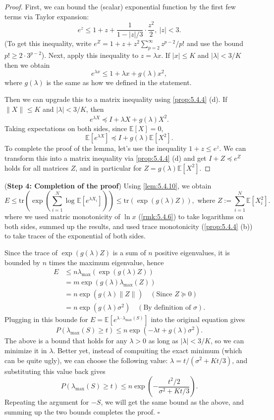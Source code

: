 \begin{proof}
First, we can bound the (scalar) exponential function by the first few terms via Taylor expansion:
\[ e^z \leq 1 + z + \frac{1}{1 - |z| / 3} \cdot \frac{z^2}{2}, \ |z| < 3. \]
(To get this inequality, write $e^Z = 1 + z + z^2 \sum_{p = 2}^{\infty} z^{p - 2} / p!$ and use the bound 
$p! \geq 2 \cdot 3^{p - 2}$). Next, apply this inequality to $z = \lambda x$. If $|x| \leq K$ and 
$|\lambda| < 3/K$ then we obtain 
\[ e^{\lambda x} \leq 1 + \lambda x + g(\lambda)x^2, \]
where $g(\lambda)$ is the same as how we defined in the statement.

Then we can upgrade this to a matrix inequality using \cref{prop:5.4.4} (d). If $\lVert X \rVert_{} \leq K$ and 
$|\lambda| < 3 / K$, then 
\[ e^{\lambda X} \preceq I + \lambda X + g(\lambda) X^2. \]
Taking expectations on both sides, since $\mathbb{E}[X] = 0$, 
\[ \mathbb{E}[e^{\lambda X}] \preceq I + g(\lambda) \mathbb{E}[X^2]. \]
To complete the proof of the lemma, let's use the inequality $1 + z \leq e^z$. We can transform this into a 
matrix inequality via \cref{prop:5.4.4} (d) and get $I + Z \preceq e^Z$ holds for all matrices $Z$, and in 
particular for $Z = g(\lambda)\mathbb{E}[X^2]$.
\end{proof}

(\textbf{Step 4: Completion of the proof}) Using \cref{lem:5.4.10}, we obtain 
\[ E \leq \mathrm{tr}\left( \exp{\left( \sum_{i = 1}^{N} \log_{}{\mathbb{E}[e^{\lambda X_i}]} 
\right)} \right) \leq \mathrm{tr}(\exp{(g(\lambda)Z)}), \text{ where } Z := \sum_{i = 1}^{N} \mathbb{E}[X_i^2]. \]where we used matric monotonicity of $\ln{x}$ (\cref{rmk:5.4.6}) to take logarithms on both sides, summed up 
the results, and used trace monotonicity (\cref{prop:5.4.4} (b)) to take traces of the exponential of both sides.

Since the trace of $\exp{(g(\lambda)Z)}$ is a sum of $n$ positive eigenvalues, it is bounded by $n$ times the 
maximum eigenvalue, hence 
\begin{align*}
	E 
	&\leq n \lambda_{\mathrm{max}}(\exp{(g(\lambda)Z)}) \\
	&= m \exp{(g(\lambda) \lambda_{\mathrm{max}}(Z))} \\
	&= n \exp{(g(\lambda) \lVert Z \rVert_{})} \quad (\text{Since } Z \succeq 0) \\
	&= n \exp{(g(\lambda)\sigma^2)} \quad (\text{By definition of } \sigma).
\end{align*}
Plugging in this bounde for $E = \mathbb{E}[e^{\lambda \cdot \lambda_{\mathrm{max}}(S)}]$ into the original 
equation gives
\[ P(\lambda_{\mathrm{max}}(S) \geq t) \leq n \exp{(-\lambda t + g(\lambda)\sigma^2)}. \]
The above is a bound that holds for any $\lambda > 0$ as long as $|\lambda| < 3/K$, so we can minimize it in 
$\lambda$. Better yet, instead of compuiting the exact minimum (which can be quite ugly), we can choose the 
following value: $\lambda = t / (\sigma^2 + Kt / 3)$, and substituting this value back gives 
\[ P(\lambda_{\mathrm{max}}(S) \geq t) \leq n \exp{\left( -\frac{t^2 / 2}{\sigma^2 + Kt / 3} \right)}. \]
Repeating the argument for $-S$, we will get the same bound as the above, and summing up the two bounds 
completes the proof. $\square$

